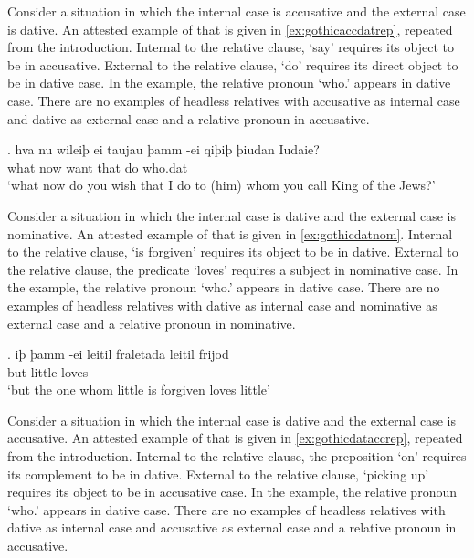 Consider a situation in which the internal case is accusative and the external case is dative. An attested example of that is given in  \ref{ex:gothicaccdatrep}, repeated from the introduction. Internal to the relative clause,  `say' requires its object to be in accusative. External to the relative clause,  `do' requires its direct object to be in dative case. In the example, the relative pronoun  `who.' appears in dative case. There are no examples of headless relatives with accusative as internal case and dative as external case and a relative pronoun in accusative.

\exg. hva nu wileiþ ei taujau þamm -ei qiþiþ þiudan Iudaie?\\
 what now want that do\scsub{[dat]} who.\ac{dat}    \\
 `what now do you wish that I do to (him) whom you call King of the Jews?' \label{ex:gothicdataccrep}

Consider a situation in which the internal case is dative and the external case is nominative. An attested example of that is given in  \ref{ex:gothicdatnom}. Internal to the relative clause,  `is forgiven' requires its object to be in dative. External to the relative clause, the predicate  `loves' requires a subject in nominative case. In the example, the relative pronoun  `who.' appears in dative case. There are no examples of headless relatives with dative as internal case and nominative as external case and a relative pronoun in nominative.

\exg. iþ þamm -ei leitil fraletada leitil frijod\\
 but     little loves\scsub{[nom]}\\
 `but the one whom little is forgiven loves little' \label{ex:gothicdatnom}

Consider a situation in which the internal case is dative and the external case is accusative. An attested example of that is given in  \ref{ex:gothicdataccrep}, repeated from the introduction. Internal to the relative clause, the preposition  `on' requires its complement to be in dative. External to the relative clause,  `picking up' requires its object to be in accusative case. In the example, the relative pronoun  `who.' appears in dative case. There are no examples of headless relatives with dative as internal case and accusative as external case and a relative pronoun in accusative.

